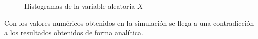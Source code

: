 \documentclass{article}
\begin{document}
\begin{figure}[H]
\centering
{}
\label{fig:a}
\centering
{}
\label{fig:s}
\centering
\caption{Histogramas de la variable aleatoria $X$ }
\label{fig:p} 
\end{figure}
Con los valores numéricos obtenidos en la simulación se llega a una contradicción a los resultados obtenidos de forma analítica. 
\end{document}
